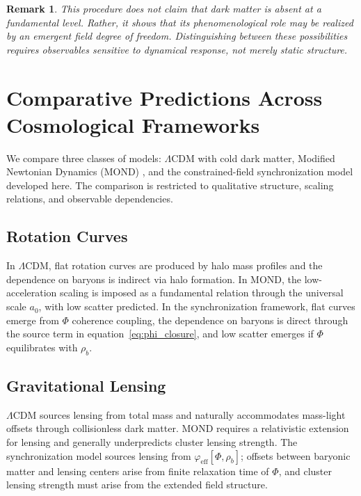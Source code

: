 \documentclass[11pt, a4paper, twocolumn]{article}
\newtheorem{remark}[definition]{Remark}
\begin{document}
\begin{remark}
This procedure does not claim that dark matter is absent at a fundamental level.
Rather, it shows that its phenomenological role may be realized by an emergent
field degree of freedom. Distinguishing between these possibilities requires
observables sensitive to dynamical response, not merely static structure.
\end{remark}

\section{Comparative Predictions Across Cosmological Frameworks}

We compare three classes of models: $\Lambda$CDM with cold dark matter, Modified
Newtonian Dynamics (MOND) \cite{milgrom1983}, and the constrained-field
synchronization model developed here. The comparison is restricted to qualitative
structure, scaling relations, and observable dependencies.

\subsection{Rotation Curves}

In $\Lambda$CDM, flat rotation curves are produced by halo mass profiles and
the dependence on baryons is indirect via halo formation. In MOND, the
low-acceleration scaling is imposed as a fundamental relation through the
universal scale $a_0$, with low scatter predicted. In the synchronization
framework, flat curves emerge from $\Phi$ coherence coupling, the dependence
on baryons is direct through the source term in equation~\eqref{eq:phi_closure},
and low scatter emerges if $\Phi$ equilibrates with $\rho_b$.

\subsection{Gravitational Lensing}

$\Lambda$CDM sources lensing from total mass and naturally accommodates
mass-light offsets through collisionless dark matter. MOND requires a
relativistic extension for lensing and generally underpredicts cluster lensing
strength. The synchronization model sources lensing from
$\varphi_{\mathrm{eff}}[\Phi,\rho_b]$; offsets between baryonic matter and
lensing centers arise from finite relaxation time of $\Phi$, and cluster lensing
strength must arise from the extended field structure.
\end{document}
